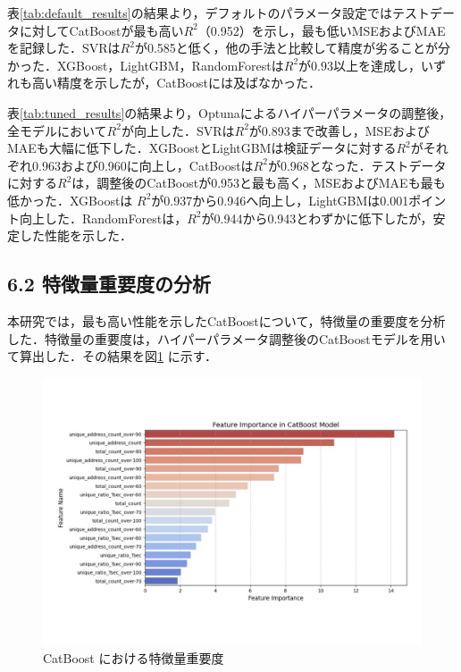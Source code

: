 表\ref{tab:default_results}の結果より，デフォルトのパラメータ設定ではテストデータに対してCatBoostが最も高い$R^2$（0.952）を示し，最も低いMSEおよびMAEを記録した．SVRは$R^2$が0.585と低く，他の手法と比較して精度が劣ることが分かった．XGBoost，LightGBM，RandomForestは$R^2$が0.93以上を達成し，いずれも高い精度を示したが，CatBoostには及ばなかった．

表\ref{tab:tuned_results}の結果より，Optunaによるハイパーパラメータの調整後，全モデルにおいて$R^2$が向上した．SVRは$R^2$が0.893まで改善し，MSEおよびMAEも大幅に低下した．XGBoostとLightGBMは検証データに対する$R^2$がそれぞれ0.963および0.960に向上し，CatBoostは$R^2$が0.968となった．テストデータに対する$R^2$は，調整後のCatBoostが0.953と最も高く，MSEおよびMAEも最も低かった．XGBoostは $R^2$が0.937から0.946へ向上し，LightGBMは0.001ポイント向上した．RandomForestは，$R^2$が0.944から0.943とわずかに低下したが，安定した性能を示した．

\subsection*{6.2 特徴量重要度の分析}
本研究では，最も高い性能を示したCatBoostについて，特徴量の重要度を分析した．特徴量の重要度は，ハイパーパラメータ調整後のCatBoostモデルを用いて算出した．その結果を図\ref{fig:feature_importance} に示す．
\begin{figure}[htbp]
    \centering
    \includegraphics[width=1.2\linewidth]{./fig/feature_importance.pdf}
    \caption{CatBoost における特徴量重要度}
    \label{fig:feature_importance}
\end{figure}

